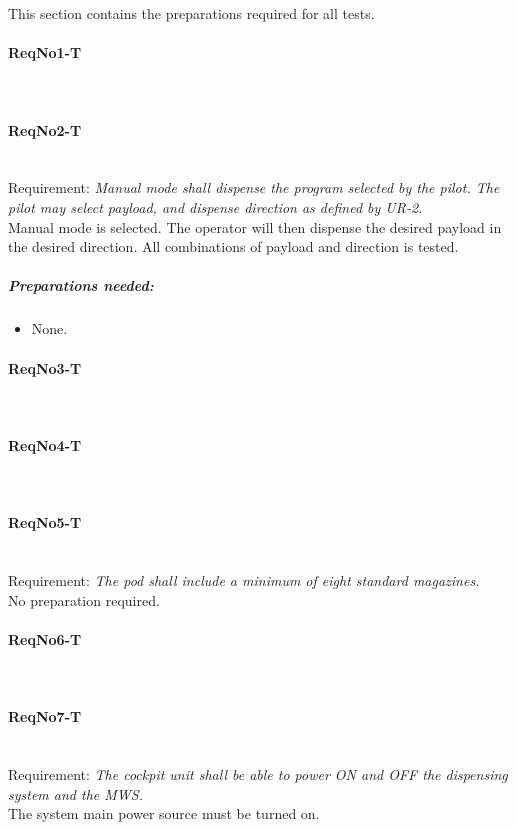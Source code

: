This section contains the preparations required for all tests.

\paragraph{ReqNo1-T}\mbox{}\\ %

\paragraph{ReqNo2-T}\mbox{}\\ %
Requirement: \textit{Manual mode shall dispense the program selected by the pilot. The pilot may select payload, and dispense direction as defined by UR-2.}
\\
Manual mode is selected. The operator will then dispense the desired payload in the desired direction. All combinations of payload and direction is tested.
\\
	\subparagraph{Preparations needed:}
	\begin{itemize}
	\item None.
	\end{itemize}

\paragraph{ReqNo3-T}\mbox{}\\ %


\paragraph{ReqNo4-T}\mbox{}\\ %

\paragraph{ReqNo5-T}\mbox{}\\ %
Requirement: \textit{The pod shall include a minimum of eight standard magazines.}\\
No preparation required.

\paragraph{ReqNo6-T}\mbox{}\\ %

\paragraph{ReqNo7-T}\mbox{}\\ %
Requirement: \textit{The cockpit unit shall be able to power ON and OFF the dispensing system and the MWS.}\\
The system main power source must be turned on.

